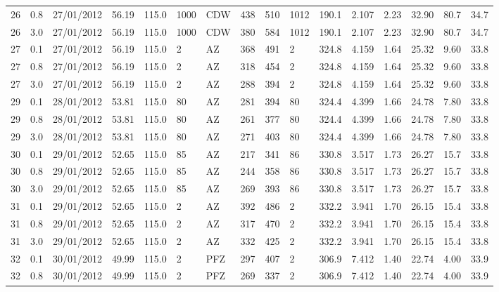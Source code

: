 {\begin{landscape}
\begin{longtable}{llllllllllllllll}
26 & 0.8 & 27/01/2012 & \textminus{}56.19 & 115.0 & 1000 & CDW & 438 & 510 & 1012 & 190.1 & 2.107 & 2.23 & 32.90 & 80.7 & 34.7\\
26 & 3.0 & 27/01/2012 & \textminus{}56.19 & 115.0 & 1000 & CDW & 380 & 584 & 1012 & 190.1 & 2.107 & 2.23 & 32.90 & 80.7 & 34.7\\
27 & 0.1 & 27/01/2012 & \textminus{}56.19 & 115.0 & 2 & AZ & 368 & 491 & 2 & 324.8 & 4.159 & 1.64 & 25.32 & 9.60 & 33.8\\
27 & 0.8 & 27/01/2012 & \textminus{}56.19 & 115.0 & 2 & AZ & 318 & 454 & 2 & 324.8 & 4.159 & 1.64 & 25.32 & 9.60 & 33.8\\
27 & 3.0 & 27/01/2012 & \textminus{}56.19 & 115.0 & 2 & AZ & 288 & 394 & 2 & 324.8 & 4.159 & 1.64 & 25.32 & 9.60 & 33.8\\
29 & 0.1 & 28/01/2012 & \textminus{}53.81 & 115.0 & 80 & AZ & 281 & 394 & 80 & 324.4 & 4.399 & 1.66 & 24.78 & 7.80 & 33.8\\
29 & 0.8 & 28/01/2012 & \textminus{}53.81 & 115.0 & 80 & AZ & 261 & 377 & 80 & 324.4 & 4.399 & 1.66 & 24.78 & 7.80 & 33.8\\
29 & 3.0 & 28/01/2012 & \textminus{}53.81 & 115.0 & 80 & AZ & 271 & 403 & 80 & 324.4 & 4.399 & 1.66 & 24.78 & 7.80 & 33.8\\
30 & 0.1 & 29/01/2012 & \textminus{}52.65 & 115.0 & 85 & AZ & 217 & 341 & 86 & 330.8 & 3.517 & 1.73 & 26.27 & 15.7 & 33.8\\
30 & 0.8 & 29/01/2012 & \textminus{}52.65 & 115.0 & 85 & AZ & 244 & 358 & 86 & 330.8 & 3.517 & 1.73 & 26.27 & 15.7 & 33.8\\
30 & 3.0 & 29/01/2012 & \textminus{}52.65 & 115.0 & 85 & AZ & 269 & 393 & 86 & 330.8 & 3.517 & 1.73 & 26.27 & 15.7 & 33.8\\
31 & 0.1 & 29/01/2012 & \textminus{}52.65 & 115.0 & 2 & AZ & 392 & 486 & 2 & 332.2 & 3.941 & 1.70 & 26.15 & 15.4 & 33.8\\
31 & 0.8 & 29/01/2012 & \textminus{}52.65 & 115.0 & 2 & AZ & 317 & 470 & 2 & 332.2 & 3.941 & 1.70 & 26.15 & 15.4 & 33.8\\
31 & 3.0 & 29/01/2012 & \textminus{}52.65 & 115.0 & 2 & AZ & 332 & 425 & 2 & 332.2 & 3.941 & 1.70 & 26.15 & 15.4 & 33.8\\
32 & 0.1 & 30/01/2012 & \textminus{}49.99 & 115.0 & 2 & PFZ & 297 & 407 & 2 & 306.9 & 7.412 & 1.40 & 22.74 & 4.00 & 33.9\\
32 & 0.8 & 30/01/2012 & \textminus{}49.99 & 115.0 & 2 & PFZ & 269 & 337 & 2 & 306.9 & 7.412 & 1.40 & 22.74 & 4.00 & 33.9\\

\end{longtable}
\end{landscape}}
